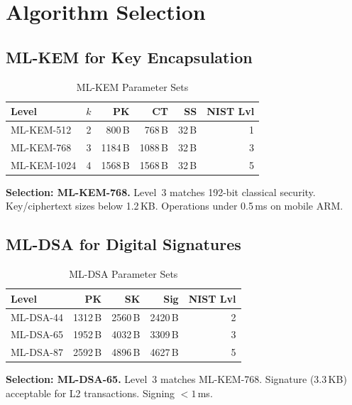 \documentclass[11pt,a4paper]{article}
\begin{document}
\section{Algorithm Selection}
\label{sec:selection}

\subsection{ML-KEM for Key Encapsulation}

\begin{table}[h]
\centering
\caption{ML-KEM Parameter Sets}
\label{tab:mlkem}
\begin{tabular}{@{}lrrrrr@{}}
\toprule
\textbf{Level} & $k$ & \textbf{PK} & \textbf{CT} & \textbf{SS} &
    \textbf{NIST Lvl} \\
\midrule
ML-KEM-512  & 2 &  800\,B &  768\,B & 32\,B & 1 \\
ML-KEM-768  & 3 & 1184\,B & 1088\,B & 32\,B & 3 \\
ML-KEM-1024 & 4 & 1568\,B & 1568\,B & 32\,B & 5 \\
\bottomrule
\end{tabular}
\end{table}

\textbf{Selection: ML-KEM-768.}  Level~3 matches 192-bit classical security.
Key/ciphertext sizes below 1.2\,KB.  Operations under 0.5\,ms on mobile ARM.

\subsection{ML-DSA for Digital Signatures}

\begin{table}[h]
\centering
\caption{ML-DSA Parameter Sets}
\label{tab:mldsa}
\begin{tabular}{@{}lrrrr@{}}
\toprule
\textbf{Level} & \textbf{PK} & \textbf{SK} & \textbf{Sig} &
    \textbf{NIST Lvl} \\
\midrule
ML-DSA-44 & 1312\,B & 2560\,B & 2420\,B & 2 \\
ML-DSA-65 & 1952\,B & 4032\,B & 3309\,B & 3 \\
ML-DSA-87 & 2592\,B & 4896\,B & 4627\,B & 5 \\
\bottomrule
\end{tabular}
\end{table}

\textbf{Selection: ML-DSA-65.}  Level~3 matches ML-KEM-768.  Signature
(3.3\,KB) acceptable for L2 transactions.  Signing $<1$\,ms.
\end{document}

